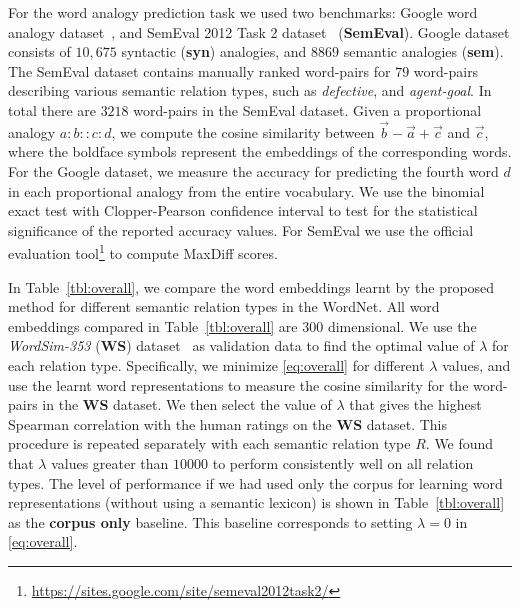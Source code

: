 \documentclass[letterpaper]{article}
\newcommand{\citep}{\cite}
\begin{document}
For the word analogy prediction task we used two benchmarks: Google word analogy dataset~\citep{Mikolov:NIPS:2013},
and SemEval 2012 Task 2 dataset~\citep{SemEavl2012:Task2} (\textbf{SemEval}). 
Google dataset consists of $10,675$ syntactic (\textbf{syn}) analogies, and $8869$ semantic analogies (\textbf{sem}).
The SemEval dataset contains manually ranked word-pairs
for $79$ word-pairs describing various semantic relation types, such as \emph{defective}, and \emph{agent-goal}. 
In total there are $3218$ word-pairs in the SemEval dataset.
Given a proportional analogy  $a:b :: c:d$, we compute the cosine similarity between $\vec{b} - \vec{a} + \vec{c}$ and
$\vec{c}$, where the boldface symbols represent the embeddings of the corresponding words. For the Google dataset, we measure the
accuracy for predicting the fourth word $d$ in each proportional analogy from the entire vocabulary.
We use the binomial exact test with Clopper-Pearson confidence interval to test for the statistical significance of
the reported accuracy values. 
For SemEval we use the official evaluation tool\footnote{\url{https://sites.google.com/site/semeval2012task2/}}
to compute MaxDiff scores.

In Table~\ref{tbl:overall}, we compare the word embeddings learnt by the proposed method for different semantic relation
types in the WordNet.
All word embeddings compared in Table~\ref{tbl:overall} are $300$ dimensional. 
We use the \emph{WordSim-353} (\textbf{WS}) dataset~\citep{Finklestein:02} 
as validation data to find the optimal value of $\lambda$ for each relation type.
Specifically, we minimize \eqref{eq:overall} for different $\lambda$ values,
and use the learnt word representations to measure the cosine similarity for the word-pairs in the \textbf{WS} dataset.
We then select the value of $\lambda$ that gives the highest Spearman correlation
with the human ratings on the \textbf{WS} dataset. This procedure is repeated separately with each semantic relation type $R$.
We found that $\lambda$ values greater than $10000$ to perform consistently well on all relation types. 
The level of performance if we had used only the corpus for learning word representations (without using a semantic lexicon)
 is shown in Table~\ref{tbl:overall} as the \textbf{corpus only} baseline.
This baseline corresponds to setting $\lambda = 0$ in \eqref{eq:overall}.
\end{document}
